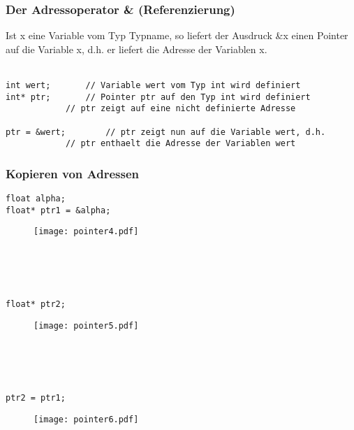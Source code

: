 \subsubsection{Der Adressoperator \& \textbf{(Referenzierung)}\hfill}
\label{sec:Der Adressoperator}
Ist x eine Variable vom Typ Typname, so liefert der Ausdruck \&x einen Pointer auf die Variable x, d.h. er liefert die Adresse der Variablen x.\\
\\
\noindent
\begin{minipage}{\linewidth}
\begin{lstlisting}
int wert;		// Variable wert vom Typ int wird definiert
int* ptr;		// Pointer ptr auf den Typ int wird definiert
			// ptr zeigt auf eine nicht definierte Adresse
		
ptr = &wert;		// ptr zeigt nun auf die Variable wert, d.h. 
			// ptr enthaelt die Adresse der Variablen wert
\end{lstlisting}
\end{minipage}

\subsubsection{Kopieren von Adressen\hfill}
\label{sec:Kopieren von Adressen}
\noindent
\begin{minipage}{\linewidth}
\begin{lstlisting}
float alpha;
float* ptr1 = &alpha;
\end{lstlisting}
\end{minipage}
\begin{figure}[h!]
	\centering
	\texttt{[image: pointer4.pdf]}
\end{figure}
\\ \\ \\
\noindent
\begin{minipage}{\linewidth}
\begin{lstlisting}
float* ptr2;
\end{lstlisting}
\end{minipage}
\begin{figure}[h!]
	\centering
	\texttt{[image: pointer5.pdf]}
\end{figure}
\\ \\ \\
\noindent
\begin{minipage}{\linewidth}
\begin{lstlisting}
ptr2 = ptr1;
\end{lstlisting}
\end{minipage}
\begin{figure}[h!]
	\centering
	\texttt{[image: pointer6.pdf]}
\end{figure}
\\ \\ \\

